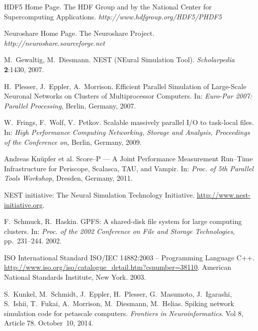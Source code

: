 \documentclass[]{YIC2015}
\begin{document}
\begin{thebibliography}{99}
HDF5 Home Page. The HDF Group and by the National Center for Supercomputing Applications. \textit{http://www.hdfgroup.org/HDF5/PHDF5}

Neuroshare Home Page. The Neuroshare Project. \textit{http://neuroshare.sourceforge.net}

M.~Gewaltig, M.~Diesmann. NEST (NEural Simulation Tool). \textit{Scholarpedia} %
\textbf{2}:1430, 2007.

H.~Plesser, J.~Eppler, A.~Morrison. Efficient Parallel Simulation of Large-Scale
                  Neuronal Networks on Clusters of Multiprocessor
                  Computers. In: \textit{Euro-Par 2007: Parallel Processing}, Berlin, Germany, 2007.

W.~Frings, F.~Wolf, V.~Petkov. Scalable massively parallel I/O to task-local files.
 In: \textit{High Performance Computing Networking, Storage and Analysis, Proceedings of the Conference on}, Berlin, Germany, 2009.

Andreas Kn\"upfer et al. Score--P --- A Joint Performance Measurement Run--Time Infrastructure for Periscope, Scalasca, TAU, and Vampir. In: \textit{Proc. of 5th Parallel Tools Workshop}, Dresden, Germany, 2011.

  NEST initiative: The Neural Simulation Technology Initiative. \url{http://www.nest-initiative.org}.

  F.~Schmuck, R.~Haskin. GPFS: A shared-disk file system for large computing clusters.
  In: \textit{Proc. of the 2002 Conference on File and Storage Technologies}, pp.~231--244. 2002.

  ISO International Standard ISO/IEC 14882:2003 -- Programming Language C++.
  \url{http://www.iso.org/iso/catalogue_detail.htm?csnumber=38110}.
  American National Standards Institute, New York. 2003.

  S.~Kunkel, M.~Schmidt, J.~Eppler, H.~Plesser, G.~Masumoto, J.~Igarashi, S.~Ishii, T.~Fukai, A.~Morrison, M.~Diesmann, M.~Helias.
  Spiking network simulation code for petascale computers.
  \textit{Frontiers in Neuroinformatics}. Vol 8, Article 78. October~10, 2014.


\end{thebibliography}
\end{document}
